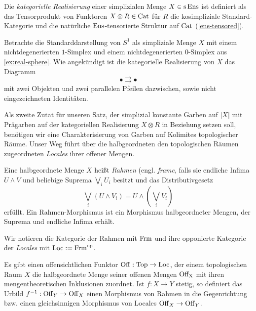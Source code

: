 \begin{defn}
  Die \emph{kategorielle Realisierung} einer simplizialen Menge $X \in
  \operatorname{s}\operatorname{Ens}$ ist definiert als das Tensorprodukt von Funktoren $X \otimes
  R \in \operatorname{Cat}$ für $R$ die kosimpliziale Standard-Kategorie und die
  natürliche $\operatorname{Ens}$-tensorierte Struktur auf $\operatorname{Cat}$
  (\ref{ens-tensored}).
\end{defn}
\begin{bsp}
  Betrachte die Standarddarstellung von $S^1$ als simpliziale Menge
  $X$ mit einem nichtdegenerierten $1$-Simplex und einem
  nichtdegenerierten $0$-Simplex aus \ref{ex:real-sphere}. Wie
  angekündigt ist die kategorielle Realisierung von $X$ das Diagramm
  \[ \bullet \rightrightarrows \bullet \]
  mit zwei Objekten und zwei parallelen Pfeilen dazwischen, sowie
  nicht eingezeichneten Identitäten.
\end{bsp}

Als zweite Zutat für unseren Satz, der simplizial konstante Garben auf
$|X|$ mit Prägarben auf der kategoriellen Realisierung $X \otimes R$
in Beziehung setzen soll, benötigen wir eine Charakterisierung von
Garben auf Kolimites topologischer Räume. Unser Weg führt über die
halbgeordneten den topologischen Räumen zugeordneten \emph{Locales}
ihrer offener Mengen.
\begin{defn}
  Eine halbgeordnete Menge $X$ heißt \emph{Rahmen}
  (engl. \emph{frame}, falls sie endliche Infima $U \wedge V$ und
  beliebige Suprema $\bigvee_i U_i$ besitzt und das Distributivgesetz
  \[ \bigvee_i (U \wedge V_i) = U \wedge (\bigvee_i V_i) \]
  erfüllt. Ein Rahmen-Morphismus ist ein Morphismus halbgeordneter
  Mengen, der Suprema und endliche Infima erhält.
\end{defn}
Wir notieren die Kategorie der Rahmen mit $\operatorname{Frm}$ und ihre opponierte
Kategorie der \emph{Locales} mit $\operatorname{Loc} := \operatorname{Frm}^\mathrm{op}$.

Es gibt einen offensichtlichen Funktor $\operatorname{Off}: \operatorname{Top} \to \operatorname{Loc}$, der
einem topologischen Raum $X$ die halbgeordnete Menge seiner offenen
Mengen $\operatorname{Off_X}$ mit ihren mengentheoretischen Inklusionen zuordnet. Ist
$f: X \to Y$ stetig, so definiert das Urbild $f^{-1}: \operatorname{Off}_Y \to
\operatorname{Off}_X$ einen Morphismus von Rahmen in die Gegenrichtung bzw. einen
gleichsinnigen Morphismus von Locales $\operatorname{Off}_X \to \operatorname{Off}_Y$.

